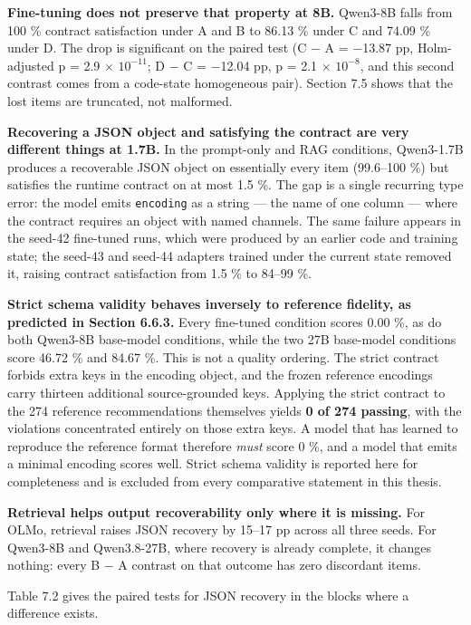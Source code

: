 \textbf{Fine-tuning does not preserve that property at 8B.} Qwen3-8B falls from 100 \% contract satisfaction under A and B to 86.13 \% under C and 74.09 \% under D. The drop is significant on the paired test (C \ensuremath{-} A = \ensuremath{-}13.87 pp, Holm-adjusted p = 2.9 \(\times\) \(10^{-11}\); D \ensuremath{-} C = \ensuremath{-}12.04 pp, p = 2.1 \(\times\) \(10^{-8}\), and this second contrast comes from a code-state homogeneous pair). Section 7.5 shows that the lost items are truncated, not malformed.

\textbf{Recovering a JSON object and satisfying the contract are very different things at 1.7B.} In the prompt-only and RAG conditions, Qwen3-1.7B produces a recoverable JSON object on essentially every item (99.6--100 \%) but satisfies the runtime contract on at most 1.5 \%. The gap is a single recurring type error: the model emits \texttt{encoding} as a string --- the name of one column --- where the contract requires an object with named channels. The same failure appears in the seed-42 fine-tuned runs, which were produced by an earlier code and training state; the seed-43 and seed-44 adapters trained under the current state removed it, raising contract satisfaction from 1.5 \% to 84--99 \%.

\textbf{Strict schema validity behaves inversely to reference fidelity, as predicted in Section 6.6.3.} Every fine-tuned condition scores 0.00 \%, as do both Qwen3-8B base-model conditions, while the two 27B base-model conditions score 46.72 \% and 84.67 \%. This is not a quality ordering. The strict contract forbids extra keys in the encoding object, and the frozen reference encodings carry thirteen additional source-grounded keys. Applying the strict contract to the 274 reference recommendations themselves yields \textbf{0 of 274 passing}, with the violations concentrated entirely on those extra keys. A model that has learned to reproduce the reference format therefore \emph{must} score 0 \%, and a model that emits a minimal encoding scores well. Strict schema validity is reported here for completeness and is excluded from every comparative statement in this thesis.

\textbf{Retrieval helps output recoverability only where it is missing.} For OLMo, retrieval raises JSON recovery by 15--17 pp across all three seeds. For Qwen3-8B and Qwen3.8-27B, where recovery is already complete, it changes nothing: every B \ensuremath{-} A contrast on that outcome has zero discordant items.

Table 7.2 gives the paired tests for JSON recovery in the blocks where a difference exists.

